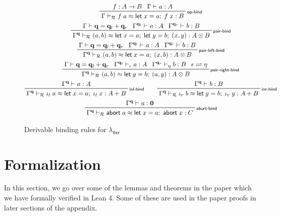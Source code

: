 \documentclass[acmsmall,screen,review]{acmart}
\newcommand{\mc}[1]{\ensuremath{\mathcal{#1}}}
\newcommand{\mb}[1]{\ensuremath{\mathbf{#1}}}
\newcommand{\ms}[1]{\ensuremath{\mathsf{#1}}}
\newcommand{\linl}[1]{\iota_l\;{#1}}
\newcommand{\linr}[1]{\iota_r\;{#1}}
\newcommand{\labort}[1]{\ms{abort}\;{#1}}
\newcommand{\letexpr}[3]{\ensuremath{\ms{let}\;#1 = #2;\;#3}}
\newcommand{\qsp}[4]{#1 \vdash #2 = #3 + #4}
\newcommand{\rle}[1]{{\scriptsize\textsf{#1}}}
\newcommand{\hasty}[4]{#1 \vdash_{#2} #3: {#4}}
\newcommand{\teqv}{\approx}
\newcommand{\tmeq}[5]{#1 \vdash_{#2} #3 \teqv #4 : {#5}}
\newcommand{\subiterexp}{\texorpdfstring{\(\lambda_{\ms{iter}}\)}{lambda-iter}}
\newcommand{\slides}{\rightleftharpoons}
\begin{document}
\begin{figure}
  \begin{adjustbox}{minipage=1.1\textwidth,scale=0.9}
  \begin{gather*}
    \prftree[r]{\rle{op-bind}}
      {f : A \to B}
      {\hasty{\Gamma}{}{a}{A}}
      {\tmeq{\Gamma}{\mc{R}}{f\;a}{\letexpr{x}{a}{f\;x}}{B}} 
      \\
    \prftree[r]{\rle{pair-bind}}
      {\qsp{\Gamma}{\mb{q}}{\mb{q}_l}{\mb{q}_r}}
      {\hasty{\Gamma^{\mb{q}_l}}{}{a}{A}}
      {\hasty{\Gamma^{\mb{q}_r}}{}{b}{B}}
      {\tmeq{\Gamma^{\mb{q}}}{\mc{R}}{(a, b)}{\letexpr{x}{a}{\letexpr{y}{b}{(x, y)}}}{A \otimes B}} 
      \\
    \prftree[r]{\rle{pair-left-bind}}
      {\qsp{\Gamma}{\mb{q}}{\mb{q}_l}{\mb{q}_r}}
      {\hasty{\Gamma^{\mb{q}_l}}{}{a}{A}}
      {\hasty{\Gamma^{\mb{q}_r}}{}{b}{B}}
      {\tmeq{\Gamma^{\mb{q}}}{\mc{R}}{(a, b)}{\letexpr{x}{a}{(x, b)}}{A \otimes B}} 
      \\
    \prftree[r]{\rle{pair-right-bind}}
      {\qsp{\Gamma}{\mb{q}}{\mb{q}_l}{\mb{q}_r}}
      {\hasty{\Gamma^{\mb{q}_l}}{\epsilon}{a}{A}}
      {\hasty{\Gamma^{\mb{q}_r}}{\eta}{b}{B}}
      {\epsilon \slides \eta}
      {\tmeq{\Gamma^{\mb{q}}}{\mc{R}}{(a, b)}{\letexpr{y}{b}{(a, y)}}{A \otimes B}} 
      \\
    \prftree[r]{\rle{inl-bind}}
      {\hasty{\Gamma^{\mb{q}}}{}{a}{A}}
      {\tmeq{\Gamma^{\mb{q}}}{\mc{R}}{\linl{a}}{\letexpr{x}{a}{\linl{x}}}{A + B}} \qquad
    \prftree[r]{\rle{inr-bind}}
      {\hasty{\Gamma^{\mb{q}}}{}{b}{B}}
      {\tmeq{\Gamma^{\mb{q}}}{\mc{R}}
      {\linr{b}}{\letexpr{y}{b}{\linr{y}}}{A + B}} 
      \\
    \prftree[r]{\rle{abort-bind}}
      {\hasty{\Gamma^{\mb{q}}}{}{a}{\mb{0}}}
      {\tmeq{\Gamma^{\mb{q}}}{\mc{R}}{\labort{a}}{\letexpr{x}{a}{\labort{x}}}{C}} 
      \\
  \end{gather*}
  \end{adjustbox}
  \caption{Derivable binding rules for \subiterexp{}}
  \Description{}
  \label{fig:derivable-binding}
\end{figure}

\section{Formalization}

In this section, we go over some of the lemmas and theorems in the paper which we have formally
verified in Lean 4. Some of these are used in the paper proofs in later sections of the appendix.
\end{document}
